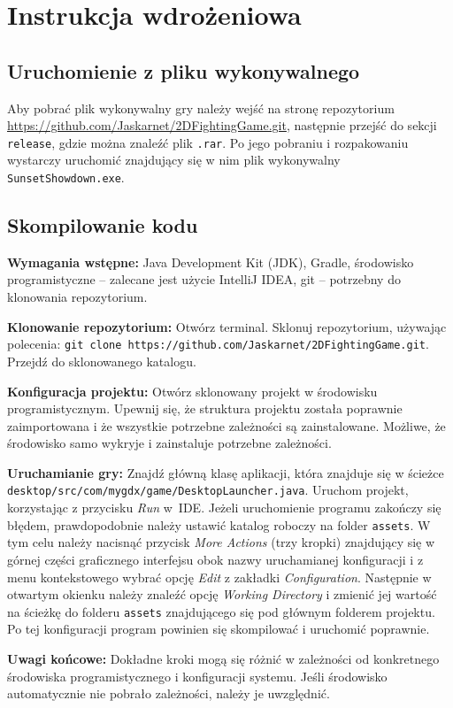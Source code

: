 \chapter{Instrukcja wdrożeniowa}
\section{Uruchomienie z pliku wykonywalnego}
Aby pobrać plik wykonywalny gry należy wejść na stronę repozytorium \url{https://github.com/Jaskarnet/2DFightingGame.git}, następnie przejść do sekcji \texttt{release}, gdzie można znaleźć plik \texttt{.rar}. Po jego pobraniu i rozpakowaniu wystarczy uruchomić znajdujący się w nim plik wykonywalny \texttt{SunsetShowdown.exe}.

\section{Skompilowanie kodu}
\noindent \textbf{Wymagania wstępne:}
Java Development Kit (JDK), Gradle, środowisko programistyczne -- zalecane jest użycie IntelliJ IDEA, git -- potrzebny do klonowania repozytorium.

\noindent \textbf{Klonowanie repozytorium:}
Otwórz terminal. Sklonuj repozytorium, używając polecenia: \texttt{git clone https://github.com/Jaskarnet/2DFightingGame.git}. Przejdź do sklonowanego katalogu.

\noindent \textbf{Konfiguracja projektu:}
Otwórz sklonowany projekt w środowisku programistycznym. Upewnij się, że struktura projektu została poprawnie zaimportowana i że wszystkie potrzebne zależności są zainstalowane. Możliwe, że środowisko samo wykryje i zainstaluje potrzebne zależności.

\noindent \textbf{Uruchamianie gry:}
Znajdź główną klasę aplikacji, która znajduje się w ścieżce \texttt{desktop/src/com/mygdx/game/DesktopLauncher.java}. Uruchom projekt, korzystając z przycisku \emph{Run} w~IDE. Jeżeli uruchomienie programu zakończy się błędem, prawdopodobnie należy ustawić katalog roboczy na folder \texttt{assets}. W tym celu należy nacisnąć przycisk \emph{More Actions} (trzy kropki) znajdujący się w górnej części graficznego interfejsu obok nazwy uruchamianej konfiguracji i z menu kontekstowego wybrać opcję \emph{Edit} z zakładki \emph{Configuration}. Następnie w otwartym okienku należy znaleźć opcję \emph{Working Directory} i zmienić jej wartość na ścieżkę do folderu \texttt{assets} znajdującego się pod głównym folderem projektu. Po tej konfiguracji program powinien się skompilować i uruchomić poprawnie.

\noindent \textbf{Uwagi końcowe:}
Dokładne kroki mogą się różnić w zależności od konkretnego środowiska programistycznego i konfiguracji systemu. Jeśli środowisko automatycznie nie pobrało zależności, należy je uwzględnić.